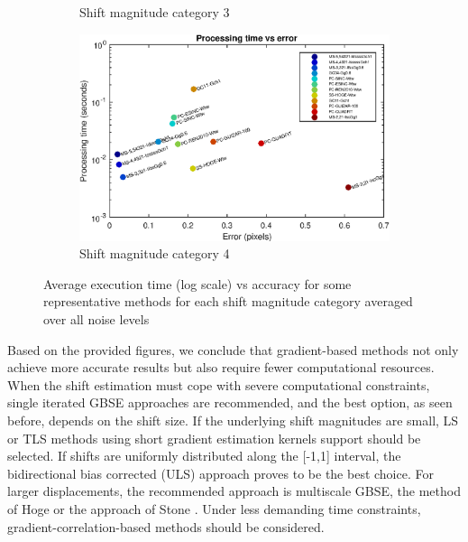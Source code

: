 \begin{figure}[ht!]
\begin{subfigure}{.5\linewidth}
		\caption{\footnotesize{Shift magnitude category 3}}
	\end{subfigure}%
	\begin{subfigure}{.5\linewidth}
	\vspace{3mm}
		\includegraphics[width=1\textwidth]{img/avgTimesVsAccuracyShift4}
		\caption{\footnotesize{Shift magnitude category 4}}
	\end{subfigure}%
		
	\caption{Average execution time (log scale) vs accuracy for some representative methods for each shift magnitude category averaged over all noise levels}
	\label{fig:avgTimesVsAccuracyByShift}
\end{figure}

Based on the provided figures, we conclude that gradient-based methods not only achieve more accurate results but also require fewer computational resources. When the shift estimation must cope with severe computational constraints, single iterated GBSE approaches are recommended, and the best option, as seen before, depends on the shift size. If the underlying shift magnitudes are small, LS or TLS methods using short gradient estimation kernels support should be selected. If shifts are uniformly distributed along the [-1,1] interval, the bidirectional bias corrected (ULS) approach proves to be the best choice. For larger displacements, the recommended approach is  multiscale GBSE, the method of Hoge \cite{Hoge_2003} or the approach of Stone \cite{Stone_2001}. Under less demanding time constraints, gradient-correlation-based methods should be considered.

